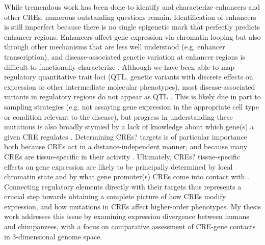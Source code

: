 {While tremendous work has been done to identify and characterize enhancers and other CREs, numerous outstanding questions remain. Identification of enhancers is still imperfect because there is no single epigenetic mark that perfectly predicts enhancer regions. Enhancers affect gene expression via chromatin looping but also through other mechanisms that are less well understood (e.g. enhancer transcription), and disease-associated genetic variation at enhancer regions is difficult to functionally characterize \cite{Enhancers: 5 essential questions}. Although we have been able to map regulatory quantitative trait loci (QTL, genetic variants with discrete effects on expression or other intermediate molecular phenotypes), most disease-associated variants in regulatory regions do not appear as QTL \cite{Umans et al. 2020 (Where are the disease-associated eQTLs?)}. This is likely due in part to sampling strategies (e.g. not assaying gene expression in the appropriate cell type or condition relevant to the disease), but progress in understanding these mutations is also broadly stymied by a lack of knowledge about which gene(s) a given CRE regulates \cite{Umans et al. 2020}. Determining CREs? targets is of particular importance both because CREs act in a distance-independent manner, and because many CREs are tissue-specific in their activity \cite{Levine 2010 (Transcriptional enhancers in animal development and evolution), Ong et al. 2011 (Enhancer function new insights into the regulation of tissue-specific gene expression), Allis et al. 2016 (The molecular hallmarks of epigenetic control), Won et al. 2008 (Prediction of regulatory elements in mammalian genomes using chromatin signatures)}. Ultimately, CREs? tissue-specific effects on gene expression are likely to be principally determined by local chromatin state and by what gene promoter(s) CREs come into contact with \cite{Garcia-Gonzalez et al 2016 (Chromatin remodeling effects on enhancer activity)}. Connecting regulatory elements directly with their targets thus represents a crucial step towards obtaining a complete picture of how CREs modify expression, and how mutations in CREs affect higher-order phenotypes. My thesis work addresses this issue by examining expression divergence between humans and chimpanzees, with a focus on comparative assessment of CRE-gene contacts in 3-dimensional genome space.

}
